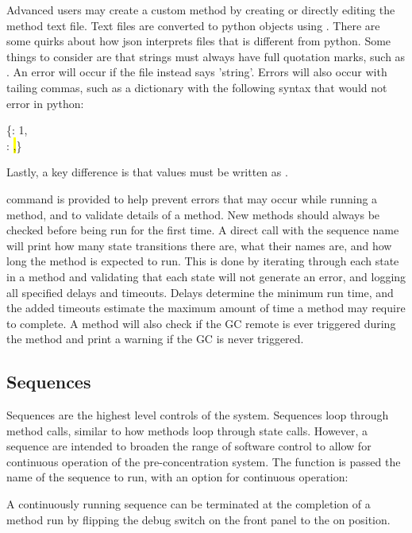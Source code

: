 Advanced users may create a custom method by creating or directly editing the method text file. Text files are converted to python objects using . There are some quirks about how json interprets files that is different from python. Some things to consider are that strings must always have full quotation marks, such as . An error will occur if the file instead says 'string'. Errors will also occur with tailing commas, such as a dictionary with the following syntax that would not error in python:
\begin{center}
    \{: 1,\\
    : \colorbox{yellow}{,}\}
\end{center}
Lastly, a key difference is that  values must be written as .

 command is provided to help prevent errors that may occur while running a method, and to validate details of a method. New methods should always be checked before being run for the first time. A direct call with the sequence name will print how many state transitions there are, what their names are, and how long the method is expected to run. This is done by iterating through each state in a method and validating that each state will not generate an error, and logging all specified delays and timeouts. Delays determine the minimum run time, and the added timeouts estimate the maximum amount of time a method may require to complete. A method will also check if the GC remote is ever triggered during the method and print a warning if the GC is never triggered.


\subsection{Sequences}

Sequences are the highest level controls of the system. Sequences loop through method calls, similar to how methods loop through state calls. However, a sequence are intended to broaden the range of software control to allow for continuous operation of the pre-concentration system. The function is passed the name of the sequence to run, with an option for continuous operation:


A continuously running sequence can be terminated at the completion of a method run by flipping the debug switch on the front panel to the on position.

